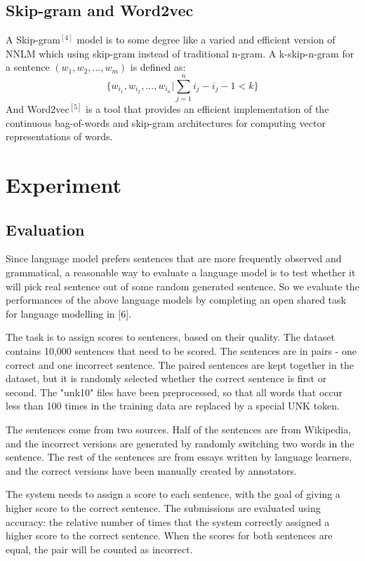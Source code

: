 \documentclass[11pt, oneside]{article}   	%
\begin{document}
\subsection{Skip-gram and Word2vec}
A Skip-gram$^{[4]}$ model is to some degree like a varied and efficient version of NNLM which using skip-gram instead of traditional n-gram. A k-skip-n-gram for a sentence  $(w_1,w_2,...,w_m)$ is defined as:
\[
\{w_{i_1},w_{i_2},...,w_{i_n}|\sum_{j=1}^{n}{i_j-i_j-1} <k\}
\]
And Word2vec$^[5]$ is a tool that provides an efficient implementation of the continuous bag-of-words and skip-gram architectures for computing vector representations of words.
\section{Experiment}
\subsection{Evaluation}
Since language model prefers sentences that are more frequently observed and grammatical, a reasonable way to evaluate a language model is to test whether it will pick real sentence out of some random generated sentence. So we evaluate the performances of the above language models by completing an open shared task for language modelling in [6].

The task is to assign scores to sentences, based on their quality. The dataset contains 10,000 sentences that need to be scored. The sentences are in pairs - one correct and one incorrect sentence. The paired sentences are kept together in the dataset, but it is randomly selected whether the correct sentence is first or second. The "unk10" files have been preprocessed, so that all words that occur less than 100 times in the training data are replaced by a special UNK token. 

The sentences come from two sources. Half of the sentences are from Wikipedia, and the incorrect versions are generated by randomly switching two words in the sentence. The rest of the sentences are from essays written by language learners, and the correct versions have been manually created by annotators.

The system needs to assign a score to each sentence, with the goal of giving a higher score to the correct sentence. The submissions are evaluated using accuracy: the relative number of times that the system correctly assigned a higher score to the correct sentence. When the scores for both sentences are equal, the pair will be counted as incorrect. 
\end{document}
